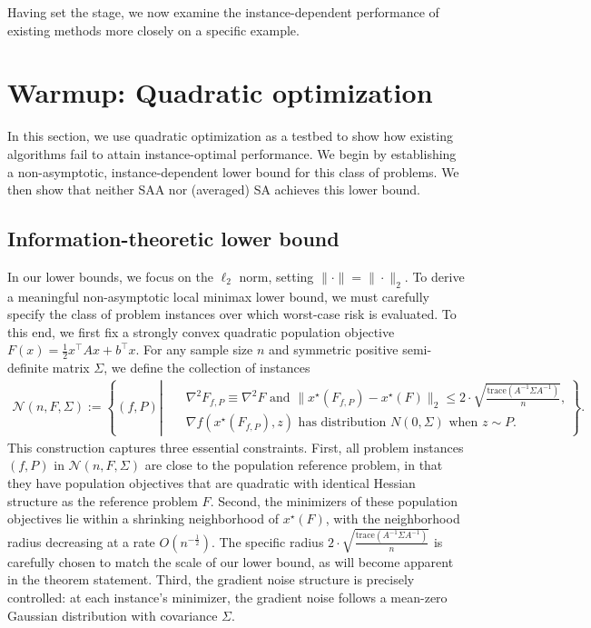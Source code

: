 \documentclass[11pt,twoside]{article}
\numberwithin{equation}{section}
\newcommand{\trace}[1]{\mathrm{trace}\left(#1\right)}
\newcommand{\cN}{\mathcal{N}}
\newcommand{\1}{\mathbf{1}}
\theoremstyle{remark}
\theoremstyle{plain}
\newcommand{\nclass}{\cN}
\begin{document}
Having set the stage, we now examine the instance-dependent performance of existing methods more closely on a specific example.

\section{Warmup: Quadratic optimization} \label{sec:suboptimality}
In this section, we use quadratic optimization as a testbed to show how existing algorithms fail to attain instance-optimal performance. We begin by establishing a non-asymptotic, instance-dependent lower bound for this class of problems. We then show that neither SAA nor (averaged) SA achieves this lower bound. 

\subsection{Information-theoretic lower bound}

In our lower bounds, we focus on the $\ell_2$ norm, setting $\| \cdot \| = \| \cdot \|_2$.
To derive a meaningful non-asymptotic local minimax lower bound, we must carefully specify the class of problem instances over which worst-case risk is evaluated. 
To this end, we first fix a strongly convex quadratic population objective $F(x) = \frac{1}{2} x^\top A x + b^\top x$. For any sample size $n$ and symmetric positive semi-definite matrix $\Sigma$, we define the collection of instances 
\begin{align*}
\nclass(n, F, \Sigma) :=  \left\{ (f,P) \left| 
\begin{aligned}
	&\text{ $\nabla^2 F_{f,P} \equiv \nabla^2 F$ and $\|x^\star(F_{f,P}) - x^\star(F)\|_2 \le 2\cdot\sqrt{\frac{\trace{A^{-1} \Sigma A^{-1}}}{n}}$,} \\
	& \text{ $\nabla f(x^\star(F_{f,P}),z)$ has distribution  $N(0, \Sigma)$ when $z \sim P$.}
\end{aligned}
\right.\right\}.
\end{align*}
This construction captures three essential constraints. First, all problem instances $(f,P)$ in $\nclass(n, F, \Sigma)$ are close to the population reference problem, in that they have population objectives that are quadratic with identical Hessian structure as the reference problem $F$. Second, the minimizers of these population objectives lie within a shrinking neighborhood of $x^\star(F)$, with the neighborhood radius decreasing at a rate $O(n^{-\frac{1}{2}})$. The specific radius $2\cdot\sqrt{\frac{\trace{A^{-1} \Sigma A^{-1}}}{n}}$ is carefully chosen to match the scale of our lower bound, as will become apparent in the theorem statement. Third, the gradient noise structure is precisely controlled: at each instance's minimizer, the gradient noise follows a mean-zero Gaussian distribution with covariance $\Sigma$.
\end{document}
